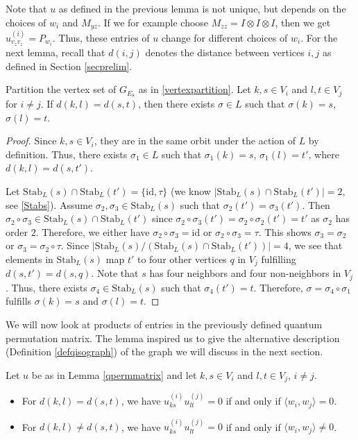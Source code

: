 Note that $u$ as defined in the previous lemma is not unique, but depends on the choices of $w_i$ and $M_{yz}$. If we for example choose $M_{zz}=I\otimes I \otimes I$, then we get $u_{v_zv_z}^{(i)}=P_{w_i}$. Thus, these entries of $u$ change for different choices of $w_i$. 
For the next lemma, recall that $d(i,j)$ denotes the distance between vertices $i,j$ as defined in Section \ref{secprelim}. 

\begin{lemm}\label{edgepermutation}
Partition the vertex set of $G_{E_8}$ as in \eqref{vertexpartition}. Let $k,s \in V_i$ and $l,t \in V_j$ for $i\neq j$. If $d(k,l)=d(s,t)$, then there exists $\sigma \in L$ such that $\sigma(k)=s$, $\sigma(l)=t$.
\end{lemm}

\begin{proof}
Since $k,s \in V_i$, they are in the same orbit under the action of $L$ by definition. Thus, there exists $\sigma_1\in L$ such that $\sigma_1(k)=s$, $\sigma_1(l)=t'$, where $d(k,l)=d(s,t')$. 

Let $\mathrm{Stab}_L(s)\cap \mathrm{Stab}_L(t')=\{\mathrm{id}, \tau\}$ (we know $|\mathrm{Stab}_L(s)\cap \mathrm{Stab}_L(t')|=2$, see \eqref{Stabs}). Assume $\sigma_2, \sigma_3 \in \mathrm{Stab}_L(s)$ such that $\sigma_2(t')=\sigma_3(t')$. Then $\sigma_2\circ \sigma_3\in \mathrm{Stab}_L(s)\cap \mathrm{Stab}_L(t')$ since $\sigma_2\circ \sigma_3(t')=\sigma_2\circ \sigma_2(t')=t'$ as $\sigma_2$ has order $2$. Therefore, we either have $\sigma_2\circ \sigma_3=\mathrm{id}$ or $\sigma_2\circ \sigma_3=\tau$. This shows $\sigma_3=\sigma_2$ or $\sigma_3=\sigma_2\circ \tau$. Since $|\mathrm{Stab}_L(s)/(\mathrm{Stab}_L(s)\cap \mathrm{Stab}_L(t'))|=4$, we see that elements in $\mathrm{Stab}_L(s)$ map $t'$ to four other vertices $q$ in $V_j$ fulfilling $d(s,t')=d(s,q)$. Note that $s$ has four neighbors and four non-neighbors in $V_j$. Thus, there exists $\sigma_4\in \mathrm{Stab}_L(s)$ such that $\sigma_4(t')=t$. Therefore, $\sigma=\sigma_4 \circ \sigma_1$ fulfills $\sigma(k)=s$ and $\sigma(l)=t$.
\end{proof}

We will now look at products of entries in the previously defined quantum permutation matrix. The lemma inspired us to give the alternative description (Definition \ref{defqisograph}) of the graph we will discuss in the next section. 

\begin{lemm}\label{prod0}
Let $u$ be as in Lemma \ref{qpermmatrix} and let $k,s \in V_i$ and $l,t\in V_j$, $i \neq j$. 
\begin{itemize}
    \item[(i)] For $d(k,l)=d(s,t)$, we have $u_{ks}^{(i)}u_{lt}^{(j)}=0$ if and only if $\langle w_i,w_j\rangle=0$.
    \item[(ii)] For $d(k,l)\neq d(s,t)$, we have $u_{ks}^{(i)}u_{lt}^{(j)}=0$ if and only if $\langle w_i,w_j\rangle\neq0$.
\end{itemize}
\end{lemm}

